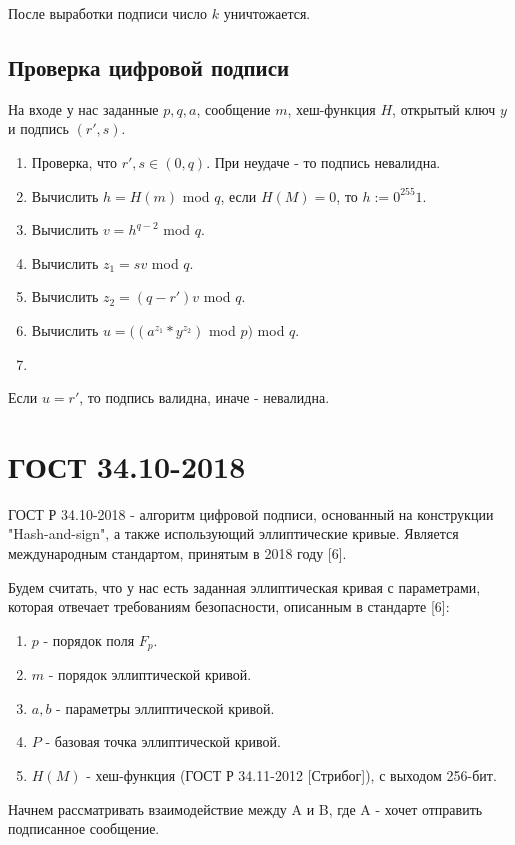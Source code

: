 \documentclass[colorthm]{./civarticle}
\begin{document}
После выработки подписи число $k$ уничтожается.

\subsection{Проверка цифровой подписи}
На входе у нас заданные $p, q, a$, сообщение $m$, хеш-функция $H$, открытый ключ $y$ и подпись $(r', s)$.

\begin{enumerate}
    \item Проверка, что $r', s \in (0, q)$. При неудаче - то подпись невалидна.
    \item Вычислить $h=H(m)$ mod $q$, если $H(M)=0$, то $h:=0^{255}1$.
    \item Вычислить $v=h^{q-2}$ mod $q$.
    \item Вычислить $z_1=sv$ mod $q$.
    \item Вычислить $z_2=(q-r')v$ mod $q$.
    \item Вычислить $u=((a^{z_1}*y^{z_2})$ mod $p)$ mod $q$.
    \item 
\end{enumerate}

Если $u = r'$, то подпись валидна, иначе - невалидна.

\section{ГОСТ 34.10-2018}
ГОСТ Р 34.10-2018 - алгоритм цифровой подписи, основанный на конструкции "Hash-and-sign", а также использующий эллиптические кривые. Является международным стандартом, принятым в 2018 году [6].

Будем считать, что у нас есть заданная эллиптическая кривая с параметрами, которая отвечает требованиям безопасности, описанным в стандарте [6]:

\begin{enumerate}
    \item $p$ - порядок поля $F_p$.
    \item $m$ - порядок эллиптической кривой.
    \item $a, b$ - параметры эллиптической кривой.
    \item $P$ - базовая точка эллиптической кривой.
    \item $H(M)$ - хеш-функция (ГОСТ Р 34.11-2012 [Стрибог]), с выходом 256-бит.
\end{enumerate}

Начнем рассматривать взаимодействие между A и B, где A - хочет отправить подписанное сообщение.
\end{document}
